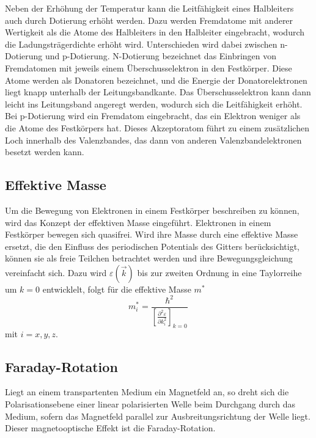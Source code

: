 Neben der Erhöhung der Temperatur kann die Leitfähigkeit eines Halbleiters auch durch Dotierung erhöht werden. Dazu 
werden Fremdatome mit anderer Wertigkeit als die Atome des Halbleiters in den Halbleiter eingebracht, wodurch die 
Ladungsträgerdichte erhöht wird. Unterschieden wird dabei zwischen n-Dotierung und p-Dotierung.
N-Dotierung bezeichnet das Einbringen von Fremdatomen mit jeweils einem Überschusselektron in den Festkörper. Diese Atome 
werden als Donatoren bezeichnet, und die Energie der Donatorelektronen liegt knapp unterhalb der Leitungsbandkante. Das Überschusselektron 
kann dann leicht ins Leitungsband angeregt werden, wodurch sich die Leitfähigkeit erhöht. 
Bei p-Dotierung wird ein Fremdatom eingebracht, das ein Elektron weniger als die Atome des Festkörpers hat. Dieses Akzeptoratom
führt zu einem zusätzlichen Loch innerhalb des Valenzbandes, das dann von anderen Valenzbandelektronen besetzt werden kann.

\subsection{Effektive Masse}
Um die Bewegung von Elektronen in einem Festkörper beschreiben zu können, wird das Konzept der effektiven Masse eingeführt.
Elektronen in einem Festkörper bewegen sich quasifrei. Wird ihre Masse durch eine effektive Masse ersetzt, die den 
Einfluss des periodischen Potentials des Gitters berücksichtigt, können sie als freie Teilchen betrachtet werden und 
ihre Bewegungsgleichung vereinfacht sich. Dazu wird $\varepsilon(\vec{k})$ bis zur zweiten Ordnung in eine
Taylorreihe um $k = 0$ entwicklelt, folgt für die effektive Masse $m^{*}$
\begin{equation*}
    m^{*}_i = \frac{\hbar^2}{\left[\frac{\partial^2 \varepsilon}{\partial k_i^2}\right]_{k = 0}} \, 
\end{equation*}
mit $i = x, y, z$.

\subsection{Faraday-Rotation}
Liegt an einem transpartenten Medium ein Magnetfeld an, so dreht
sich die Polarisationsebene einer linear polarisierten Welle beim Durchgang durch das Medium, sofern das Magnetfeld
parallel zur Ausbreitungsrichtung der Welle liegt. Dieser magnetooptische Effekt ist die Faraday-Rotation.


